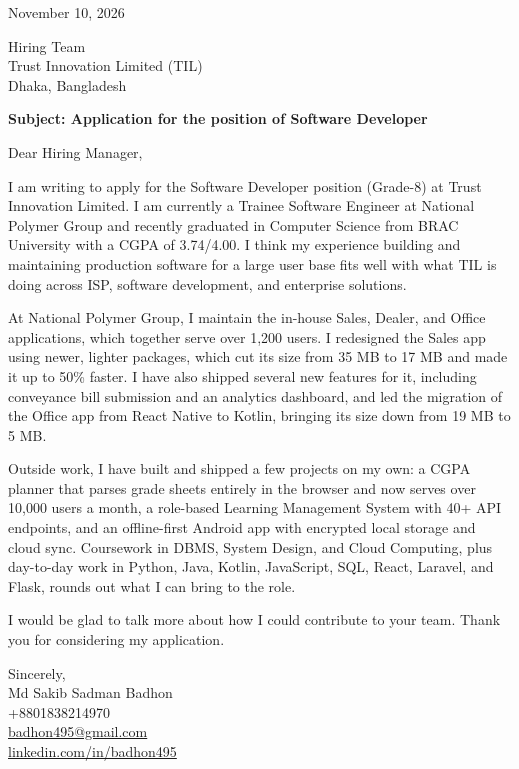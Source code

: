 \documentclass[a4paper]{article}
\begin{document}
\noindent November 10, 2026

\noindent Hiring Team \\
Trust Innovation Limited (TIL) \\
Dhaka, Bangladesh

\noindent \textbf{Subject: Application for the position of Software Developer}

\noindent Dear Hiring Manager,

\noindent I am writing to apply for the Software Developer position (Grade-8) at Trust Innovation Limited. I am currently a Trainee Software Engineer at National Polymer Group and recently graduated in Computer Science from BRAC University with a CGPA of 3.74/4.00. I think my experience building and maintaining production software for a large user base fits well with what TIL is doing across ISP, software development, and enterprise solutions.

\noindent At National Polymer Group, I maintain the in-house Sales, Dealer, and Office applications, which together serve over 1,200 users. I redesigned the Sales app using newer, lighter packages, which cut its size from 35 MB to 17 MB and made it up to 50\% faster. I have also shipped several new features for it, including conveyance bill submission and an analytics dashboard, and led the migration of the Office app from React Native to Kotlin, bringing its size down from 19 MB to 5 MB.

\noindent Outside work, I have built and shipped a few projects on my own: a CGPA planner that parses grade sheets entirely in the browser and now serves over 10,000 users a month, a role-based Learning Management System with 40+ API endpoints, and an offline-first Android app with encrypted local storage and cloud sync. Coursework in DBMS, System Design, and Cloud Computing, plus day-to-day work in Python, Java, Kotlin, JavaScript, SQL, React, Laravel, and Flask, rounds out what I can bring to the role.

\noindent I would be glad to talk more about how I could contribute to your team. Thank you for considering my application.

\vspace{6pt}
\noindent Sincerely, \\
\noindent Md Sakib Sadman Badhon \\
+8801838214970 \\
\href{mailto:badhon495@gmail.com}{badhon495@gmail.com} \\
\href{https://linkedin.com/in/badhon495/}{linkedin.com/in/badhon495}
\end{document}
